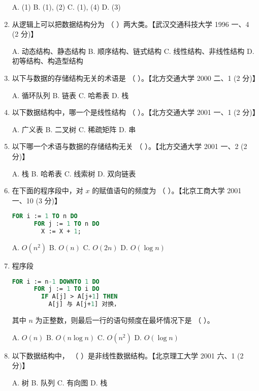 \documentclass[lang=cn,newtx,10pt,scheme=chinese]{elegantbook}
\begin{document}
\begin{enumerate}
    A. (1) \quad B. (1), (2) \quad C. (1), (4) \quad D. (3)

    \item 从逻辑上可以把数据结构分为 （ \quad）两大类。【武汉交通科技大学 1996 一、4 (2 分)】  
    
    A. 动态结构、静态结构 \quad B. 顺序结构、链式结构  
    C. 线性结构、非线性结构 \quad D. 初等结构、构造型结构

    \item 以下与数据的存储结构无关的术语是 （ \quad）。【北方交通大学 2000 二、1 (2 分)】  
    
    A. 循环队列 \quad B. 链表 \quad C. 哈希表 \quad D. 栈

    \item 以下数据结构中，哪一个是线性结构 （ \quad）。【北方交通大学 2001 一、1 (2 分)】  
    
    A. 广义表 \quad B. 二叉树 \quad C. 稀疏矩阵 \quad D. 串

    \item 以下哪一个术语与数据的存储结构无关 （ \quad）。【北方交通大学 2001 一、2 (2 分)】  
    
    A. 栈 \quad B. 哈希表 \quad C. 线索树 \quad D. 双向链表

    \item 在下面的程序段中，对 $x$ 的赋值语句的频度为 （ \quad）。【北京工商大学 2001 一、10 (3 分)】  
    
    \begin{lstlisting}[language=Pascal]
    FOR i := 1 TO n DO
      FOR j := 1 TO n DO
        X := X + 1;
    \end{lstlisting}
    
    A. $O(n^2)$ \quad B. $O(n)$ \quad C. $O(2n)$ \quad D. $O(\log n)$

    \item 程序段  
    \begin{lstlisting}[language=Pascal]
    FOR i := n-1 DOWNTO 1 DO
      FOR j := 1 TO i DO
        IF A[j] > A[j+1] THEN
          A[j] 与 A[j+1] 对换，
    \end{lstlisting}
    其中 $n$ 为正整数，则最后一行的语句频度在最坏情况下是 （ \quad）。  
    
    A. $O(n)$ \quad B. $O(n \log n)$ \quad C. $O(n^2)$ \quad D. $O(\log n)$

    \item 以下数据结构中， （ \quad）是非线性数据结构。【北京理工大学 2001 六、1 (2 分)】  
    
    A. 树 \quad B. 队列 \quad C. 有向图 \quad D. 栈


\end{enumerate}
\end{document}
